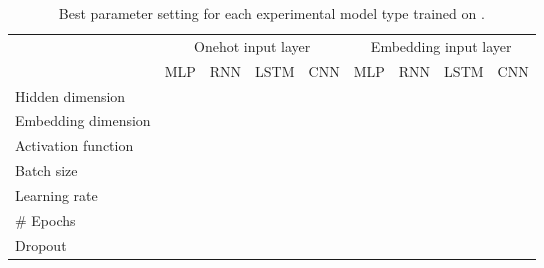 
\begin{table}[]
\centering
\begin{tabular}{lllll|llll}
                    & \multicolumn{4}{c|}{Onehot input layer} & \multicolumn{4}{c}{Embedding input layer}\\
                    & MLP     & RNN     & LSTM     & CNN     & MLP      & RNN      & LSTM      & CNN     \\\hline
Hidden dimension    &         &         &          &         &          &          &           &         \\
Embedding dimension &         &         &          &         &          &          &           &         \\
Activation function &         &         &          &         &          &          &           &         \\
Batch size          &         &         &          &         &          &          &           &         \\
Learning rate       &         &         &          &         &          &          &           &         \\
# Epochs            &         &         &          &         &          &          &           &         \\
Dropout             &         &         &          &         &          &          &           &
\end{tabular}
\caption{Best parameter setting for each experimental model type trained on \citet{Davidson:2017}.}
\label{tab:exp_model_parameters_davidson}
\end{table}

